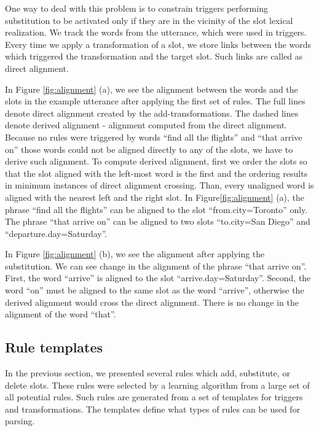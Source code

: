 \documentclass[11pt]{article}
\begin{document}

One way to deal with this problem is to constrain triggers performing substitution to be activated only if they are in the vicinity of the slot lexical realization. We track the words from the utterance, which were used in triggers. Every time we apply a transformation of a slot, we store links between the words which triggered the transformation and the target slot. Such links are called as direct alignment. 


In Figure \ref{fig:alignment} (a), we see the alignment between the words and the slots in the example utterance after applying the first set of rules. The full lines denote direct alignment created by the add-transformations. The dashed lines denote derived alignment - alignment computed from the direct alignment. Because no rules were triggered by words ``find all the flights'' and ``that arrive on'' those words could not be aligned directly to any of the slots, we have to derive such alignment. To compute derived alignment, first we order the slots so that the slot aligned with the left-most word is the first and the ordering results in minimum instances of direct alignment crossing. Than, every unaligned word is aligned with the nearest left and the right slot. In Figure\ref{fig:alignment} (a), the phrase ``find all the flights'' can be aligned to the slot ``from.city=Toronto'' only. The phrase ``that arrive on'' can be aligned to two slots ``to.city=San Diego'' and ``departure.day=Saturday''.

In Figure \ref{fig:alignment} (b), we see the alignment after applying the substitution. We can see change in the alignment of the phrase ``that arrive on''. First, the word ``arrive'' is aligned to the slot ``arrive.day=Saturday''. Second, the word ``on'' must be aligned to the same slot as the word ``arrive'',  otherwise the derived alignment would cross the direct alignment. There is no change in the alignment of the word ``that''.

\subsection{Rule templates}
In the previous section, we presented several rules which add, substitute, or delete slots. These rules were selected by a learning algorithm from a large set of all potential rules. Such rules are generated from a set of templates for triggers and transformations. The templates define what types of rules can be used for parsing. 
\end{document}
